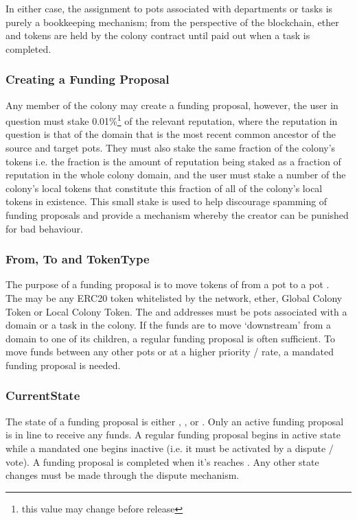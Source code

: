 In either case, the assignment to pots associated with departments or tasks is purely a bookkeeping mechanism; from the perspective of the blockchain, ether and tokens are held by the colony contract until paid out when a task is completed. 

\subsubsection*{Creating a Funding Proposal}
Any member of the colony may create a funding proposal, however, the user in question must stake 0.01\%\footnote{this value may change before release} of the relevant reputation, where the reputation in question is that of the domain that is the most recent common ancestor of the source and target pots. They must also stake the same fraction of the colony's tokens i.e. the fraction is the amount of reputation being staked as a fraction of reputation in the whole colony domain, and the user must stake a number of the colony's local tokens that constitute this fraction of all of the colony's local tokens in existence. This small stake is used to help discourage spamming of funding proposals and provide a mechanism whereby the creator can be punished for bad behaviour. 

\subsubsection*{From, To and TokenType}
The purpose of a funding proposal is to move tokens of  from a pot  to a pot . \\
The  may be any ERC20 token whitelisted by the network, ether, Global Colony Token or Local Colony Token. The  and  addresses must be pots associated with a domain or a task in the colony. If the funds are to move `downstream' from a domain to one of its children, a regular funding proposal is often sufficient. To move funds between any other pots or at a higher priority / rate, a mandated funding proposal is needed.

\subsubsection*{CurrentState}
The state of a funding proposal is either , ,  or . Only an active funding proposal is in line to receive any funds. A regular funding proposal begins in active state while a mandated one begins inactive (i.e. it must be activated by a dispute / vote). A funding proposal is completed when it's  reaches . Any other state changes must be made through the dispute mechanism.

